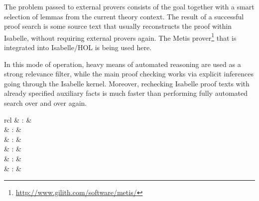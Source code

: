 \begin{isabellebody}
\begin{isamarkuptext}
  The problem passed to external provers consists of the goal together
  with a smart selection of lemmas from the current theory context.
  The result of a successful proof search is some source text that
  usually reconstructs the proof within Isabelle, without requiring
  external provers again.  The Metis
  prover\footnote{\url{http://www.gilith.com/software/metis/}} that is
  integrated into Isabelle/HOL is being used here.

  In this mode of operation, heavy means of automated reasoning are
  used as a strong relevance filter, while the main proof checking
  works via explicit inferences going through the Isabelle kernel.
  Moreover, rechecking Isabelle proof texts with already specified
  auxiliary facts is much faster than performing fully automated
  search over and over again.

  \begin{matharray}{rcl}
    \hypertarget{command.HOL.sledgehammer}{\hyperlink{command.HOL.sledgehammer}{\mbox{}}}\isa{{\isachardoublequote}\isactrlsup {\isacharasterisk}{\isachardoublequote}} & : &  \\
    \hypertarget{command.HOL.print-atps}{\hyperlink{command.HOL.print-atps}{\mbox{}}}\isa{{\isachardoublequote}\isactrlsup {\isacharasterisk}{\isachardoublequote}} & : &  \\
    \hypertarget{command.HOL.atp-info}{\hyperlink{command.HOL.atp-info}{\mbox{}}}\isa{{\isachardoublequote}\isactrlsup {\isacharasterisk}{\isachardoublequote}} & : &  \\
    \hypertarget{command.HOL.atp-kill}{\hyperlink{command.HOL.atp-kill}{\mbox{}}}\isa{{\isachardoublequote}\isactrlsup {\isacharasterisk}{\isachardoublequote}} & : &  \\
    \hypertarget{command.HOL.atp-messages}{\hyperlink{command.HOL.atp-messages}{\mbox{}}}\isa{{\isachardoublequote}\isactrlsup {\isacharasterisk}{\isachardoublequote}} & : &  \\
    \hypertarget{method.HOL.metis}{\hyperlink{method.HOL.metis}{\mbox{}}} & : &  \\
  \end{matharray}


\end{isamarkuptext}
\end{isabellebody}
